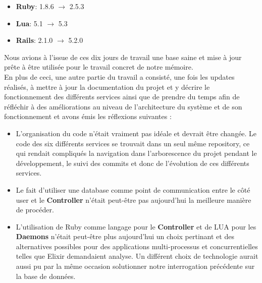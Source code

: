 \documentclass{eplmastersthesis}
\begin{document}
        \begin{itemize}
          \item \textbf{Ruby}: 1.8.6 $\rightarrow$ 2.5.3
          \item \textbf{Lua}: 5.1 $\rightarrow$ 5.3
          \item \textbf{Rails}: 2.1.0 $\rightarrow$ 5.2.0
        \end{itemize}

        Nous avions à l'issue de ces dix jours de travail une base saine et
        mise à jour prête à être utilisée pour le travail concret de notre
        mémoire.\\

        En plus de ceci, une autre partie du travail a consisté, une fois les
        updates réalisés, à mettre à jour la documentation du projet et y
        décrire le fonctionnement des différents services ainsi que de prendre
        du temps afin de réfléchir à des améliorations au niveau de
        l'architecture du système et de son fonctionnement et avons émis
        les réflexions suivantes :

        \begin{itemize}
          \item L'organisation du code n'était vraiment pas idéale et devrait
          être changée. Le code des six différents services se trouvait dans
          un seul même repository, ce qui rendait compliqués la navigation dans
          l'arborescence du projet pendant le développement, le suivi des
          commits et donc de l'évolution de ces différents services.
          \item Le fait d'utiliser une database comme point de communication
          entre le côté user et le \textbf{Controller} n'était peut-être
          pas aujourd'hui la meilleure manière de procéder.
          \item L'utilisation de Ruby comme langage pour le \textbf{Controller}
          et de LUA pour les \textbf{Daemons} n'était peut-être plus
          aujourd'hui un choix pertinant et des alternatives possibles
          pour des applications multi-processus et concurrentielles telles
          que Elixir demandaient analyse. Un différent choix de technologie
          aurait aussi pu par la même occasion solutionner notre interrogation
          précédente sur la base de données.
        \end{itemize}
\end{document}
